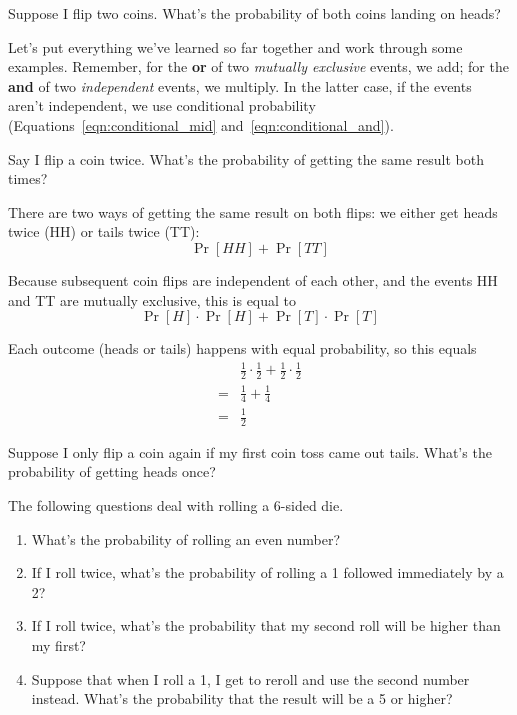 \begin{exercise}
    Suppose I flip two coins. What's the probability of both coins landing on heads?
\end{exercise}

Let's put everything we've learned so far together and work through some examples. 
Remember, for the \textbf{or} of two \emph{mutually exclusive} events, we add; 
for the \textbf{and} of two \emph{independent} events, we multiply. In the latter 
case, if the events aren't independent, we use conditional probability 
(Equations~\ref{eqn:conditional_mid} and~\ref{eqn:conditional_and}).

\begin{example}
    Say I flip a coin twice. What's the probability of getting the 
    same result both times?

    There are two ways of getting the same result on both flips: we either 
    get heads twice (HH) or tails twice (TT):
    \[
        \Pr[HH] + \Pr[TT]
    \]

    Because subsequent coin flips are independent of each other, and the events HH and TT are mutually exclusive, this is equal to 
    \[
        \Pr[H]\cdot \Pr[H] + \Pr[T]\cdot\Pr[T]
    \]

    Each outcome (heads or tails) happens with equal 
    probability, so this equals
    \begin{align*}
        & \frac{1}{2}\cdot\frac{1}{2} + 
        \frac{1}{2}\cdot\frac{1}{2}\\
        =& \frac{1}{4} + \frac{1}{4}\\
        =& \frac{1}{2}
    \end{align*}
\end{example}

\begin{exercise}
    Suppose I only flip a coin again if my first coin toss came out tails. 
    What's the probability of getting heads once?
\end{exercise}

\begin{exercise} The following questions deal with rolling a 6-sided die.
    \renewcommand{\labelenumi}{(\alph{enumi})} 
    \begin{enumerate}
        \item What's the probability of rolling an even number?
        \item If I roll twice, what's the probability of rolling a 1 followed immediately by a 2?
        \item If I roll twice, what's the probability that my second roll will 
        be higher than my first?
        \item Suppose that when I roll a 1, I get to reroll and use the 
        second number instead. What's the probability that the result will be a 5 or higher?
    \end{enumerate}
\end{exercise}

